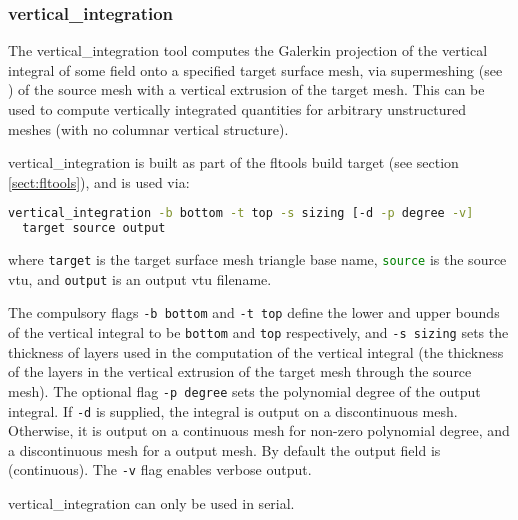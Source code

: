 
\subsubsection{vertical\_integration}
\label{sect:vertical_integration}

The vertical\_integration tool computes the Galerkin projection of the vertical
integral of some field onto a specified target surface mesh, via supermeshing (see \citet{farrell2009a,farrell2010a})
of the source mesh with a vertical extrusion of the target mesh. This can be used to
compute vertically integrated quantities for arbitrary unstructured meshes (with
no columnar vertical structure).

vertical\_integration is built as part of the fltools build target (see section \ref{sect:fltools}),
and is used via:

\begin{lstlisting}[language = Bash]
vertical_integration -b bottom -t top -s sizing [-d -p degree -v]
  target source output
\end{lstlisting}

where \lstinline[language = Bash]+target+ is the target surface mesh triangle base name,
\lstinline[language = Bash]+source+ is the source vtu, and \lstinline[language = Bash]+output+
is an output vtu filename.

The compulsory flags \lstinline[language = Bash]+-b bottom+
and \lstinline[language = Bash]+-t top+ define the lower and upper bounds of
the vertical integral to be \lstinline[language = Bash]+bottom+ and \lstinline[language = Bash]+top+
respectively, and \lstinline[language = Bash]+-s sizing+ sets the thickness of layers
used in the computation of the vertical integral (the thickness of the layers in the
vertical extrusion of the target mesh through the source mesh). The optional
flag \lstinline[language = Bash]+-p degree+ sets the polynomial degree of the
output integral. If \lstinline[language = Bash]+-d+ is supplied, the integral
is output on a discontinuous mesh. Otherwise, it is output on a continuous
mesh for non-zero polynomial degree, and a discontinuous mesh for a \Pzero
output mesh. By default the output field is \Pone (continuous).
The \lstinline[language = Bash]+-v+ flag enables verbose output.

vertical\_integration can only be used in serial.


